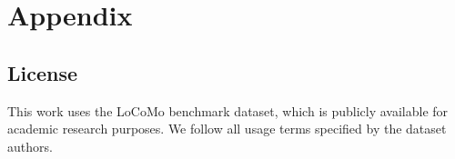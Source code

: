 \section{Appendix}


\subsection{License} \label{license}
This work uses the LoCoMo benchmark dataset, which is publicly available for academic research purposes. We follow all usage terms specified by the dataset authors. 

 

